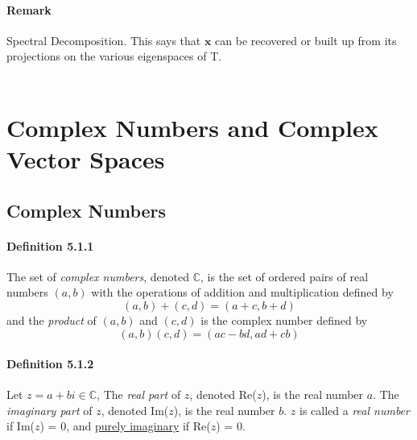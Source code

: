 \documentclass[11pt]{article}
\newcommand{\ti}[1]{\textit{#1}}
\newcommand{\tb}[1]{\textbf{#1}}
\newcommand{\under}[1]{\underline{#1}}
\newcommand{\mc}[0]{\mathbb{C}}
\newcommand{\vx}[0]{\tb{x}}
\begin{document}
{\paragraph{Remark} Spectral Decomposition. This says that $\vx$ can be recovered or built up from its projections on the various eigenspaces of T.\\\\



\section{Complex Numbers and Complex Vector Spaces}
\subsection{Complex Numbers}
\paragraph{Definition 5.1.1} The set of \ti{complex numbers}, denoted $\mathbb{C}$, is the set of ordered pairs of real numbers $(a,b)$ with the operations of addition and multiplication defined by
$$ (a,b) + (c,d) = (a+c,b+d)$$
and the \ti{product} of $(a,b)$ and $(c,d)$ is the complex number defined by
$$(a,b)(c,d) = (ac - bd, ad + cb)$$

\paragraph{Definition 5.1.2} Let $z = a + bi \in \mc$, The \ti{real part} of $z$, denoted Re($z$), is the real number $a$. The \ti{imaginary part} of $z$, denoted Im($z$), is the real number $b$. $z$ is called a \ti{real number} if Im($z$) = 0, and \under{purely imaginary} if Re($z$) = 0.

}
\end{document}
